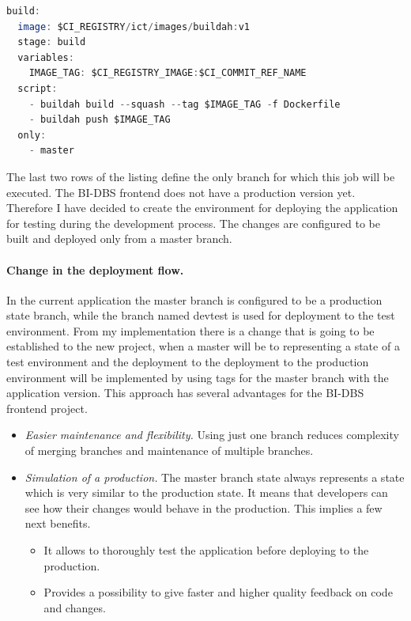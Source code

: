 \begin{lstlisting}[language=Octave, caption=Build stage in the CI/CD pipeline]
build:
  image: $CI_REGISTRY/ict/images/buildah:v1
  stage: build
  variables:
    IMAGE_TAG: $CI_REGISTRY_IMAGE:$CI_COMMIT_REF_NAME
  script:
    - buildah build --squash --tag $IMAGE_TAG -f Dockerfile
    - buildah push $IMAGE_TAG
  only:
    - master
\end{lstlisting}

\noindent The last two rows of the listing define the only branch for which this job will be executed. The BI-DBS frontend does not have a production version yet. Therefore I have decided to create the environment for deploying the application for testing during the development process. The changes are configured to be built and deployed only from a master branch.

\paragraph*{Change in the deployment flow.} In the current application the master branch is configured to be a production state branch, while the branch named devtest is used for deployment to the test environment. From my implementation there is a change that is going to be established to the new project, when a master will be to representing a state of a test environment and the deployment to the deployment to the production environment will be implemented by using tags for the master branch with the application version. This approach has several advantages for the BI-DBS frontend project.

\begin{itemize}
\item \emph{Easier maintenance and  flexibility.} Using just one branch reduces complexity of merging branches and maintenance of multiple branches. 

\item \emph{Simulation of a production. } The master branch state always represents a state which is very similar to the production state. It means that developers can see how their changes would behave in the production. This implies a few next benefits.
\begin{itemize}
    \item It allows to thoroughly test the application before deploying to the\\ production.
    \item Provides a possibility to give faster and higher quality feedback on code and changes.
\end{itemize}
\end{itemize}

